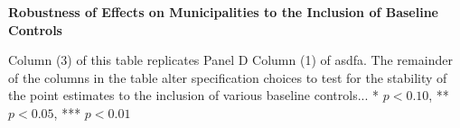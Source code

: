 \documentclass{article}
\begin{document}
\clearpage
\begin{table}[ht]
\centering
\caption{\textbf{Robustness of Effects on Municipalities to the Inclusion of Baseline Controls}}
\begin{threeparttable}

\begin{tablenotes}\footnotesize
\item Column (3) of this table replicates Panel D Column (1) of asdfa. The remainder of the columns in the table alter specification choices to test for the stability of the point estimates  to the inclusion of various baseline controls... * \(p<0.10\), ** \(p<0.05\), *** \(p<0.01\)
\end{tablenotes}
\end{threeparttable}
\end{table}

\clearpage
\end{document}
